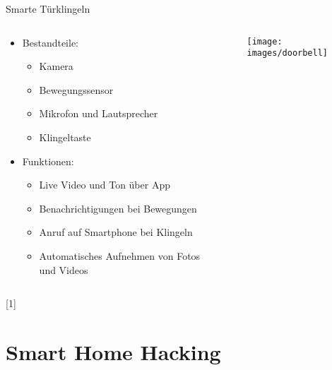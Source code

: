 \documentclass[11pt, aspectratio=169, modernfonts]{beamer}
\begin{document}
\begin{frame}{Smarte Türklingeln}
  \begin{columns}
    \begin{column}{0.6\textwidth}
      \begin{itemize}
        \item Bestandteile:
        \begin{itemize}
          \item Kamera
          \item Bewegungssensor
          \item Mikrofon und Lautsprecher
          \item Klingeltaste
        \end{itemize}
        \vspace{0.2cm}
        \item Funktionen:
        \begin{itemize}
          \item Live Video und Ton über App
          \item Benachrichtigungen bei Bewegungen
          \item Anruf auf Smartphone bei Klingeln
          \item Automatisches Aufnehmen von Fotos und Videos
        \end{itemize}
      \end{itemize}
    \end{column}

    \begin{column}{0.4\textwidth}
      \begin{figure}
        \centering
        \texttt{[image: images/doorbell]}\label{fig:doorbell}
      \end{figure}
    \end{column}
  \end{columns}
  \hfill [1]
\end{frame}
  
\section{Smart Home Hacking}
\end{document}
